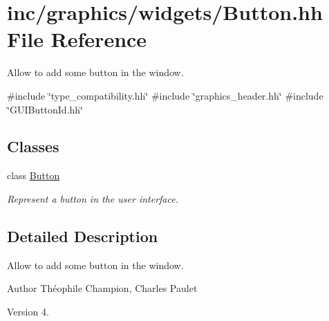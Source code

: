 \hypertarget{Button_8hh}{}\section{inc/graphics/widgets/\+Button.hh File Reference}
\label{Button_8hh}


Allow to add some button in the window.  


{\ttfamily \#include \char`\"{}type\+\_\+compatibility.\+hh\char`\"{}}\newline
{\ttfamily \#include \char`\"{}graphics\+\_\+header.\+hh\char`\"{}}\newline
{\ttfamily \#include \char`\"{}G\+U\+I\+Button\+Id.\+hh\char`\"{}}\newline
\subsection*{Classes}
\begin{DoxyCompactItemize}
\item 
class \hyperlink{classButton}{Button}
\begin{DoxyCompactList}\small\item\em Represent a button in the user interface. \end{DoxyCompactList}\end{DoxyCompactItemize}


\subsection{Detailed Description}
Allow to add some button in the window. 

\begin{DoxyAuthor}{Author}
Théophile Champion, Charles Paulet 
\end{DoxyAuthor}
\begin{DoxyVersion}{Version}
4. 
\end{DoxyVersion}
